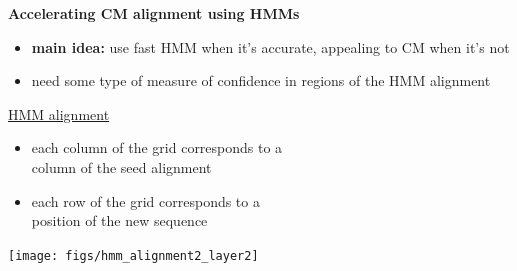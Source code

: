 \documentclass[landscape]{slides}
\begin{document}
\begin{slide}
\begin{center}

\textbf{Accelerating CM alignment using HMMs}
\end{center}
\medskip
\begin{minipage}{6in}
\footnotesize
\begin{itemize}
\item
\textbf{main idea:} use fast HMM when it's accurate, appealing to CM when it's not
\item
need some type of measure of confidence in regions of the HMM alignment

\end{itemize}
\small
\hspace{0.3in}
\underline{HMM alignment}%
\begin{itemize}
\item
each column of the grid corresponds to a \\ column
of the seed alignment
\item
each row of the grid corresponds to a \\ position of the new sequence
\end{itemize}
\vspace{3in}
\end{minipage}
\begin{minipage}{4in}
\begin{center}
\texttt{[image: figs/hmm\_alignment2\_layer2]}
\end{center}
\vspace{1.5in}
\end{minipage}
\end{slide}
\end{document}
